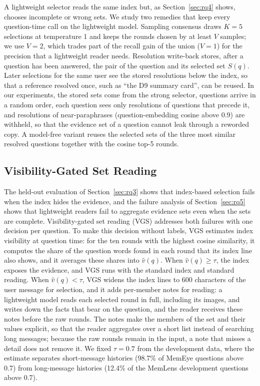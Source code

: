 A lightweight selector reads the same index but, as Section~\ref{sec:rq4} shows, chooses incomplete or wrong sets. We study two remedies that keep every question-time call on the lightweight model. Sampling consensus draws $K{=}5$ selections at temperature 1 and keeps the rounds chosen by at least $V$ samples; we use $V{=}2$, which trades part of the recall gain of the union ($V{=}1$) for the precision that a lightweight reader needs. Resolution write-back stores, after a question has been answered, the pair of the question and its selected set $S(q)$. Later selections for the same user see the stored resolutions below the index, so that a reference resolved once, such as ``the D9 summary card'', can be reused. In our experiments, the stored sets come from the strong selector, questions arrive in a random order, each question sees only resolutions of questions that precede it, and resolutions of near-paraphrases (question-embedding cosine above 0.9) are withheld, so that the evidence set of a question cannot leak through a reworded copy. A model-free variant reuses the selected sets of the three most similar resolved questions together with the cosine top-5 rounds.

\subsection{Visibility-Gated Set Reading}
\label{sec:vgs}

The held-out evaluation of Section~\ref{sec:rq3} shows that index-based selection fails when the index hides the evidence, and the failure analysis of Section~\ref{sec:rq5} shows that lightweight readers fail to aggregate evidence sets even when the sets are complete. Visibility-gated set reading (VGS) addresses both failures with one decision per question. To make this decision without labels, VGS estimates index visibility at question time: for the ten rounds with the highest cosine similarity, it computes the share of the question words found in each round that its index line also shows, and it averages these shares into $\hat{v}(q)$. When $\hat{v}(q)\ge\tau$, the index exposes the evidence, and VGS runs \qss{} with the standard index and standard reading. When $\hat{v}(q)<\tau$, VGS widens the index lines to 600 characters of the user message for selection, and it adds per-member notes for reading: a lightweight model reads each selected round in full, including its images, and writes down the facts that bear on the question, and the reader receives these notes before the raw rounds. The notes make the members of the set and their values explicit, so that the reader aggregates over a short list instead of searching long messages; because the raw rounds remain in the input, a note that misses a detail does not remove it. We fixed $\tau{=}0.7$ from the development data, where the estimate separates short-message histories (98.7\% of MemEye questions above 0.7) from long-message histories (12.4\% of the MemLens development questions above 0.7).

